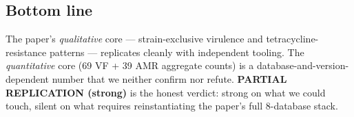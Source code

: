 \documentclass[11pt]{article}
\begin{document}
\subsection{Bottom line}
The paper's \emph{qualitative} core --- strain-exclusive virulence and tetracycline-resistance patterns --- replicates cleanly with independent tooling. The \emph{quantitative} core (69 VF + 39 AMR aggregate counts) is a database-and-version-dependent number that we neither confirm nor refute. \textbf{PARTIAL REPLICATION (strong)} is the honest verdict: strong on what we could touch, silent on what requires reinstantiating the paper's full 8-database stack.
\end{document}
